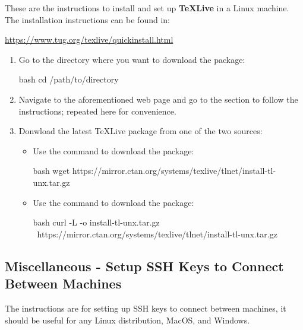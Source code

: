 These are the instructions to install and set up \textbf{TeXLive} in a Linux machine. The
installation instructions can be found in:
\begin{center}
    \url{https://www.tug.org/texlive/quickinstall.html}
\end{center}
\begin{enumerate}
    \item Go to the directory where you want to download the package:
    \begin{mintedbox}{bash}
cd /path/to/directory
    \end{mintedbox}
    \item Navigate to the aforementioned web page and go to the 
    section to follow the instructions; repeated here for convenience.
    \item Donwload the latest TeXLive package from one of the two sources:
    \begin{itemize}
        \item Use the  command to download the package:
        \begin{mintedbox}{bash}
wget https://mirror.ctan.org/systems/texlive/tlnet/install-tl-unx.tar.gz
        \end{mintedbox}
        \item Use the  command to download the package:
        \begin{mintedbox}{bash}
curl -L -o install-tl-unx.tar.gz \
https://mirror.ctan.org/systems/texlive/tlnet/install-tl-unx.tar.gz
        \end{mintedbox}
    \end{itemize}
\end{enumerate}


\subsection{Miscellaneous - Setup SSH Keys to Connect Between Machines}

The instructions are for setting up SSH keys to connect between machines, it should be useful for
any Linux distribution, MacOS, and Windows.\bigbreak

